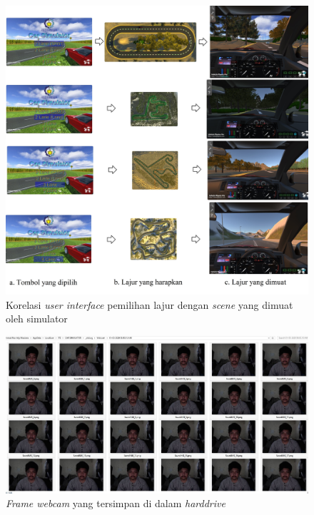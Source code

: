 \begin{figure} [!htb]
	\captionsetup{justification=centering}
	\includegraphics[scale=0.1]{img/UItest.jpg}
	\caption{Korelasi \textit{user interface} pemilihan lajur dengan \textit{scene} yang dimuat oleh simulator}
	\label{fig:4.1}
\end{figure}

\begin{figure} [!htb]
	\captionsetup{justification=centering}
	\includegraphics[scale=0.23]{img/webcam.JPG}
	\caption{\textit{Frame webcam} yang tersimpan di dalam \textit{harddrive}}
	\label{fig:4.2}
\end{figure}

